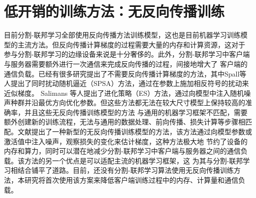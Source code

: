 \section{低开销的训练方法：无反向传播训练}
目前分割-联邦学习全部使用反向传播方法训练模型，这也是目前机器学习训练模型的主流方法。但反向传播计算梯度的过程需要大量的内存和计算资源，这对于
参与分割-联邦学习的边缘设备来说是十分奢侈的。此外，分割-联邦学习中客户端与服务器需要额外进行一次通信来完成反向传播的过程，间接地增大了
客户端的通信负载。已经有很多研究提出了不需要反向传播计算梯度的方法\cite{ma2020hsic,wang2021learning,jacot2018neural,nokland2016direct,spall1992multivariate,salimans2017evolution}，其中Spall等人\cite{spall1992multivariate}提出了同时扰动随机逼近（SPSA）方法，通过在参数上施加相反符号的扰动来近似梯度。
Salimans 等人\cite{salimans2017evolution}提出了进化策略（ES）方法，通过向模型中注入随机噪声种群并沿最优方向优化参数。但这些方法都无法在较大尺寸模型上保持较高的准确率，并且这些无反向传播训练模型的方法
与通用的机器学习框架不匹配，需要额外创建新的训练流程，无法与通用的数据处理、前向传播、损失计算等步骤相匹配。文献\cite{jiang2023one}提出了一种新型的无反向传播训练模型的方法，该方法通过向模型参数或激活值中注入噪声，观察损失的变化来估计梯度，这种方法极大地
节约了设备的内存和算力，同时可以潜在地减少分割-联邦学习中客户端与服务器之间的通信负载。该方法的另一个优点是可以适配主流的机器学习框架，这
为其与分割-联邦学习相结合铺平了道路。目前，还没有分割-联邦学习算法使用无反向传播训练方法，本研究将首次使用该方案来降低客户端训练过程中的内存、计算量和通信负载。